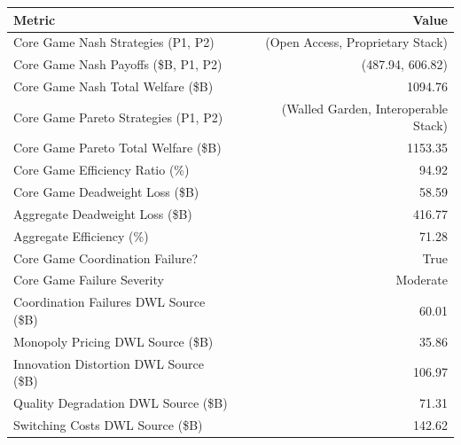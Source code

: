 

\begin{tabular}{@{}lr@{}}
\toprule
Metric & Value \\
\midrule
Core Game Nash Strategies (P1, P2) & (Open Access, Proprietary Stack) \\
Core Game Nash Payoffs (\$B, P1, P2) & (487.94, 606.82) \\
Core Game Nash Total Welfare (\$B) & 1094.76 \\
Core Game Pareto Strategies (P1, P2) & (Walled Garden, Interoperable Stack) \\
Core Game Pareto Total Welfare (\$B) & 1153.35 \\
Core Game Efficiency Ratio (\%) & 94.92 \\
Core Game Deadweight Loss (\$B) & 58.59 \\
Aggregate Deadweight Loss (\$B) & 416.77 \\
Aggregate Efficiency (\%) & 71.28 \\
Core Game Coordination Failure? & True \\
Core Game Failure Severity & Moderate \\
Coordination Failures DWL Source (\$B) & 60.01 \\
Monopoly Pricing DWL Source (\$B) & 35.86 \\
Innovation Distortion DWL Source (\$B) & 106.97 \\
Quality Degradation DWL Source (\$B) & 71.31 \\
Switching Costs DWL Source (\$B) & 142.62 \\
\bottomrule
\end{tabular}